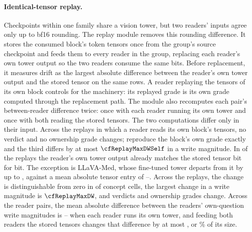 \documentclass{article}
\begin{document}
\paragraph{Identical-tensor replay.} Checkpoints within one family share a vision tower, but two readers' inputs agree only up to bf16 rounding. The replay module removes this rounding difference. It stores the consumed block's token tensors once from the group's source checkpoint and feeds them to every reader in the group, replacing each reader's own tower output so the two readers consume the same bits. Before replacement, it measures drift as the largest absolute difference between the reader's own tower output and the stored tensor on the same rows. A reader replaying the tensors of its own block controls for the machinery: its replayed grade is its own grade computed through the replacement path. The module also recomputes each pair's between-reader difference twice: once with each reader running its own tower and once with both reading the stored tensors. The two computations differ only in their input. Across the \cfReplaySelf{} replays in which a reader reads its own block's tensors, no verdict and no ownership grade changes; \cfReplaySelfExact{} reproduce the block's own grade exactly and the third differs by at most $\cfReplayMaxDWSelf$ in a write magnitude. In \cfReplayDriftZero{} of the \cfReplayBlocks{} replays the reader's own tower output already matches the stored tensor bit for bit. The exception is LLaVA-Med, whose fine-tuned tower departs from it by up to \cfReplayDriftMax{}, against a mean absolute tensor entry of \cfReplayTensorMin{}--\cfReplayTensorMax{}. Across the \cfReplayBlocks{} replays, the change is distinguishable from zero in \cfReplayMoved{} of \cfReplayCells{} concept cells, the largest change in a write magnitude is $\cfReplayMaxDW$, and \cfReplayVerdictChanges{} verdicts and \cfReplayOwnedChanges{} ownership grades change. Across the \cfReplayPairs{} reader pairs, the mean absolute difference between the readers' own-question write magnitudes is \cfReplayPairOwnMin{}--\cfReplayPairOwnMax{} when each reader runs its own tower, and feeding both readers the stored tensors changes that difference by at most \cfReplayChangeMax{}, or \cfReplayRelMax\% of its size.
\end{document}
